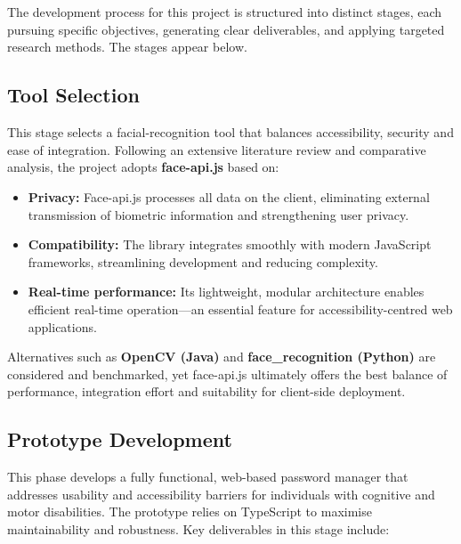 
\chapter{}%
\label{ch:methodologie}

The development process for this project is structured into distinct stages, each pursuing specific objectives, generating clear deliverables, and applying targeted research methods. The stages appear below.

\section{Tool Selection}
This stage selects a facial-recognition tool that balances accessibility, security and ease of integration.  
Following an extensive literature review and comparative analysis, the project adopts \textbf{face-api.js} based on:

\begin{itemize}
  \item \textbf{Privacy:} Face-api.js processes all data on the client, eliminating external transmission of biometric information and strengthening user privacy.
  \item \textbf{Compatibility:} The library integrates smoothly with modern 
  Java\-Script frameworks, streamlining development and reducing complexity.
  \item \textbf{Real-time performance:} Its lightweight, modular architecture enables efficient real-time operation—an essential feature for accessibility-centred web applications.
\end{itemize}

Alternatives such as \textbf{OpenCV (Java)} and \textbf{face\_recognition (Python)} are considered and benchmarked, yet face-api.js ultimately offers the best balance of performance, integration effort and suitability for client-side deployment.

\section{Prototype Development}
This phase develops a fully functional, web-based password manager that addresses usability and accessibility barriers for individuals with cognitive and motor disabilities. The prototype relies on TypeScript to maximise maintainability and robustness. Key deliverables in this stage include:

